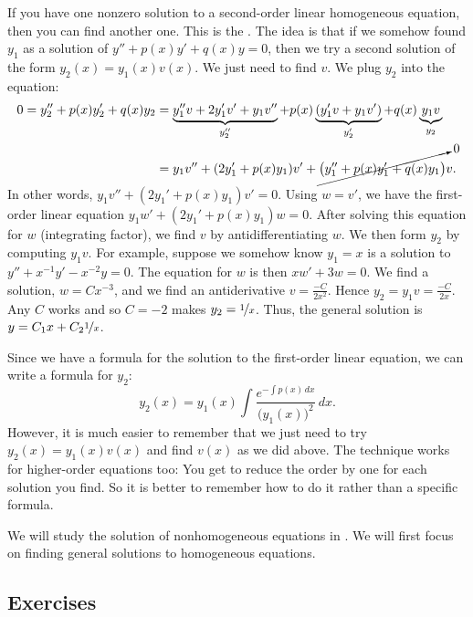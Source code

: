 If you have one nonzero solution to a second-order linear homogeneous
equation, then you can find another one.  This is the \emph{}.  The idea is that if we somehow found $y_1$ as a solution of
$y'' + p(x) y' + q(x) y = 0$, then we try a second
solution of the form $y_2(x) = y_1(x) v(x)$.
We just need to find $v$.  We plug $y_2$ into the equation:
\begin{equation*}
\begin{split}
0 = 
y_2'' + p(x) y_2' + q(x) y_2
& =
\underbrace{y_1'' v + 2 y_1' v' + y_1 v''}_{y_2''}
+ p(x) \underbrace{( y_1' v + y_1 v' )}_{y_2'}
+ q(x) \underbrace{y_1 v}_{y_2}
\\
& =
y_1 v''
+ (2 y_1' + p(x) y_1) v'
+
\cancelto{0}{\bigl( y_1'' + p(x) y_1' + q(x) y_1 \bigr)} v .
\end{split}
\end{equation*}
In other words,
$y_1 v'' + (2 y_1' + p(x) y_1) v' = 0$.  Using $w = v'$, we have the
first-order linear equation
$y_1 w' + (2 y_1' + p(x) y_1) w = 0$.  After solving this equation for $w$
(integrating factor),
we find $v$ by antidifferentiating $w$.  We then form $y_2$ by computing
$y_1 v$.  For example, suppose we somehow know $y_1 = x$ is a solution
to $y''+x^{-1}y'-x^{-2} y=0$.
The equation for $w$ is then
$xw' + 3 w = 0$.  We find a solution, $w = Cx^{-3}$, and we find an 
antiderivative $v = \frac{-C}{2x^2}$.
Hence $y_2 = y_1 v = \frac{-C}{2x}$.
Any $C$ works and so $C=-2$ makes $y_2 = \nicefrac{1}{x}$.  Thus, the
general solution is $y = C_1 x + C_2\nicefrac{1}{x}$.

Since we have a formula for the solution to the first-order linear equation,
we can write a formula for $y_2$:
\begin{equation*}
y_2(x) = y_1(x) \int \frac{e^{-\int p(x)\,dx}}{{\bigl(y_1(x)\bigr)}^2} \,dx
.
\end{equation*}
However, it is much easier to remember that we just need to try $y_2(x) =
y_1(x) v(x)$ and find $v(x)$ as we did above.  The technique
works for higher-order equations too: You get to reduce the order by one for each
solution you find.  So it is better to remember how to do
it rather than a specific formula.

\medskip

We will study the solution of nonhomogeneous equations in
.  We will first focus on finding general solutions to
homogeneous equations.


\subsection{Exercises}

